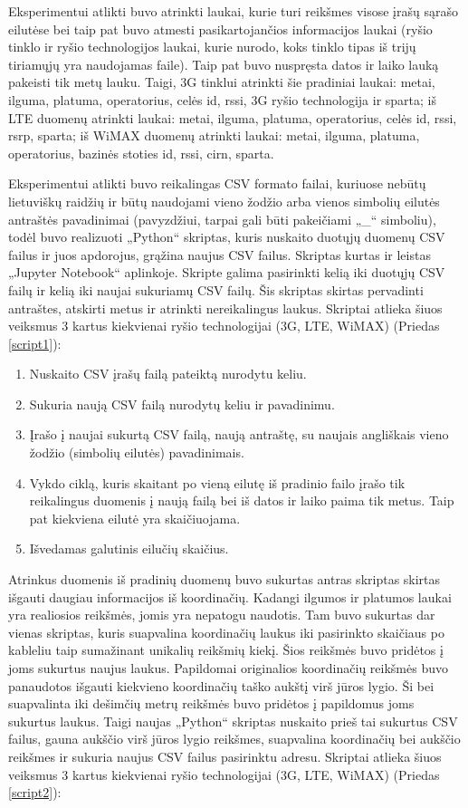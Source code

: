 \documentclass{VUMIFPSbakalaurinis}
\begin{document}
Eksperimentui atlikti buvo atrinkti laukai, kurie turi reikšmes visose įrašų sąrašo eilutėse bei taip pat buvo atmesti pasikartojančios informacijos laukai (ryšio tinklo ir ryšio technologijos laukai, kurie nurodo, koks tinklo tipas iš trijų tiriamųjų yra naudojamas faile). Taip pat buvo nuspręsta datos ir laiko lauką pakeisti tik metų lauku. Taigi, 3G tinklui atrinkti šie pradiniai laukai: metai, ilguma, platuma, operatorius, celės id, rssi, 3G ryšio technologija ir sparta; iš LTE duomenų atrinkti laukai: metai, ilguma, platuma, operatorius, celės id, rssi, rsrp, sparta; iš WiMAX duomenų atrinkti laukai: metai, ilguma, platuma, operatorius, bazinės stoties id, rssi, cirn, sparta.\par
Eksperimentui atlikti buvo reikalingas CSV formato failai, kuriuose nebūtų lietuviškų raidžių ir būtų naudojami vieno žodžio arba vienos simbolių eilutės antraštės pavadinimai (pavyzdžiui, tarpai gali būti pakeičiami „\_“ simboliu), todėl buvo realizuoti „Python“ skriptas, kuris nuskaito duotųjų duomenų CSV failus ir juos apdorojus, grąžina naujus CSV failus. Skriptas kurtas ir leistas „Jupyter Notebook“ aplinkoje. Skripte galima pasirinkti kelią iki duotųjų CSV failų ir kelią iki naujai sukuriamų CSV failų. Šis skriptas skirtas pervadinti antraštes, atskirti metus ir atrinkti nereikalingus laukus. Skriptai atlieka šiuos veiksmus 3 kartus kiekvienai ryšio technologijai (3G, LTE, WiMAX) (Priedas \ref{script1}):
\begin{enumerate}
	\item Nuskaito CSV įrašų failą pateiktą nurodytu keliu.
	\item Sukuria naują CSV failą nurodytų keliu ir pavadinimu.
	\item Įrašo į naujai sukurtą CSV failą, naują antraštę, su naujais angliškais vieno žodžio (simbolių eilutės) pavadinimais.
	\item Vykdo ciklą, kuris skaitant po vieną eilutę iš pradinio failo įrašo tik reikalingus duomenis į naują failą bei iš datos ir laiko paima tik metus. Taip pat kiekviena eilutė yra skaičiuojama.
	\item Išvedamas galutinis eilučių skaičius.
\end{enumerate}
Atrinkus duomenis iš pradinių duomenų buvo sukurtas antras skriptas skirtas išgauti daugiau informacijos iš koordinačių. Kadangi ilgumos ir platumos laukai yra realiosios reikšmės, jomis yra nepatogu naudotis. Tam buvo sukurtas dar vienas skriptas, kuris suapvalina koordinačių laukus iki pasirinkto skaičiaus po kableliu taip sumažinant unikalių reikšmių kiekį. Šios reikšmės buvo pridėtos į joms sukurtus naujus laukus. Papildomai originalios koordinačių reikšmės buvo panaudotos išgauti kiekvieno koordinačių taško aukštį virš jūros lygio. Ši bei suapvalinta iki dešimčių metrų reikšmės buvo pridėtos į papildomus joms sukurtus laukus. Taigi naujas „Python“ skriptas nuskaito prieš tai sukurtus CSV failus, gauna aukščio virš jūros lygio reikšmes, suapvalina koordinačių bei aukščio reikšmes ir sukuria naujus CSV failus pasirinktu adresu. Skriptai atlieka šiuos veiksmus 3 kartus kiekvienai ryšio technologijai (3G, LTE, WiMAX) (Priedas \ref{script2}):
\end{document}
